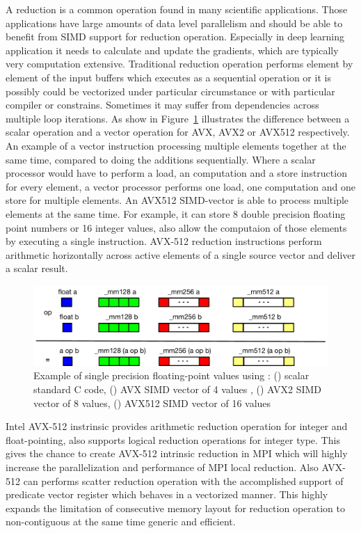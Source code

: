 \documentclass[sigconf]{acmart}
\newcommand{\mpi}[0]{\textsc{MPI}\xspace}
\begin{document}
A reduction is a common operation found in many scientific applications.
Those applications have large amounts of data level parallelism and should be able
to benefit from SIMD support for reduction operation. Especially in deep learning application
it needs to calculate and update the gradients, which are typically very computation extensive.
Traditional reduction operation performs element by element of the input buffers
which executes as a sequential operation or it is possibly could be vectorized
under particular circumstance or with particular compiler or constrains. Sometimes
it may suffer from dependencies across multiple loop iterations.
As show in Figure~\ref{fig:sse_avx} illustrates the difference between a scalar operation and
a vector operation for AVX, AVX2 or AVX512 respectively.
%
An example of a vector instruction processing multiple elements together at the same time,
compared to doing the additions sequentially. Where a scalar processor would have to perform a load, an
computation and a store instruction for every element, a vector processor performs one load, one computation and
one store for multiple elements.
An AVX512 SIMD-vector is able to process multiple elements at
the same time. For example, it can store 8 double precision floating point numbers or 16 integer values, also allow the computaion of those elements by executing a single instruction.
AVX-512 reduction instructions perform arithmetic horizontally across active elements of a
single source vector and deliver a scalar result.

\begin{figure}[h]
    \centering
    \includegraphics[width=\linewidth]{sse_avx.pdf}
    \caption{Example of single precision floating-point values using : (\colorbox{blue}{}) scalar standard C code, (\colorbox{green}{}) AVX SIMD vector of 4 values , (\colorbox{red}{}) AVX2 SIMD vector of 8 values, (\colorbox{yellow}{}) AVX512 SIMD vector of 16 values}
    \label{fig:sse_avx}
\end{figure}

Intel AVX-512 instrinsic provides arithmetic
reduction operation for integer and float-pointing, also supports logical reduction
operations for integer type.
This gives the chance to create AVX-512 intrinsic reduction in \mpi which
will highly increase the parallelization and performance of \mpi local reduction.
Also AVX-512 can performs scatter reduction operation with the accomplished
support of predicate vector register which behaves in a vectorized manner. This highly
expands the limitation of consecutive memory layout for reduction operation to non-contiguous
at the same time generic and efficient.
\end{document}
